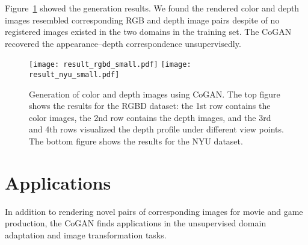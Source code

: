 \documentclass{article}
\begin{document}
Figure~\ref{fig::result_rgbd} showed the generation results. We found the rendered color and depth images resembled corresponding RGB and depth image pairs despite of no registered images existed in the two domains in the training set. The CoGAN recovered the appearance--depth correspondence unsupervisedly.

\begin{figure}[t!]
\centering
\texttt{[image: result\_rgbd\_small.pdf]}
\texttt{[image: result\_nyu\_small.pdf]}
\caption{\small Generation of color and depth images using CoGAN. The top figure shows the results for the RGBD dataset: the 1st row contains the color images, the 2nd row contains the depth images, and the 3rd and 4th rows visualized the depth profile under different view points. The bottom figure shows the results for the NYU dataset.}
\label{fig::result_rgbd}
\vspace{-2mm}
\end{figure}

\section{Applications}\label{sec::apps}

In addition to rendering novel pairs of corresponding images for movie and game production, the CoGAN finds applications in the unsupervised domain adaptation and image transformation tasks. 
\end{document}

